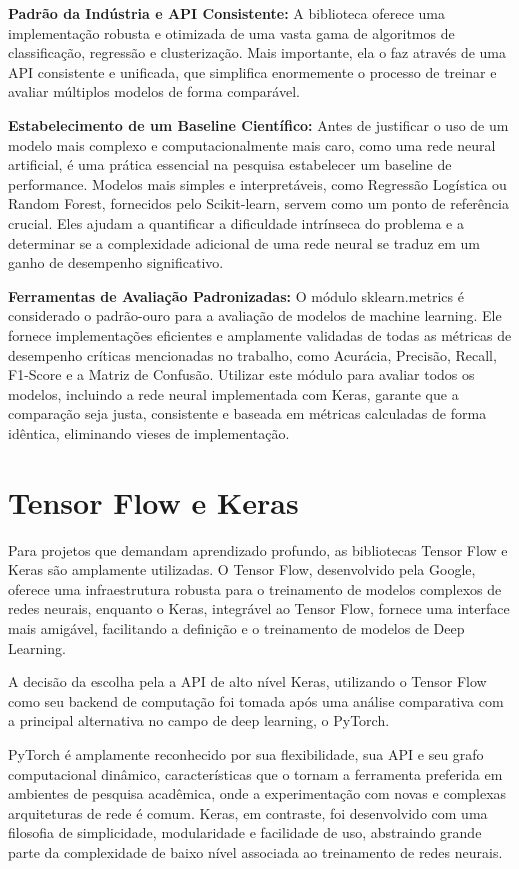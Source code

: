 \textbf{Padrão da Indústria e API Consistente:} A biblioteca oferece uma implementação robusta e otimizada de uma vasta gama de algoritmos de classificação, regressão e clusterização. Mais importante, ela o faz através de uma API consistente e unificada, que simplifica enormemente o processo de treinar e avaliar múltiplos modelos de forma comparável.

\textbf{Estabelecimento de um Baseline Científico:} Antes de justificar o uso de um modelo mais complexo e computacionalmente mais caro, como uma rede neural artificial, é uma prática essencial na pesquisa estabelecer um baseline de performance. Modelos mais simples e interpretáveis, como Regressão Logística ou Random Forest, fornecidos pelo Scikit-learn, servem como um ponto de referência crucial. Eles ajudam a quantificar a dificuldade intrínseca do problema e a determinar se a complexidade adicional de uma rede neural se traduz em um ganho de desempenho significativo.

\textbf{Ferramentas de Avaliação Padronizadas:} O módulo sklearn.metrics é considerado o padrão-ouro para a avaliação de modelos de machine learning. Ele fornece implementações eficientes e amplamente validadas de todas as métricas de desempenho críticas mencionadas no trabalho, como Acurácia, Precisão, Recall, F1-Score e a Matriz de Confusão. Utilizar este módulo para avaliar todos os modelos, incluindo a rede neural implementada com Keras, garante que a comparação seja justa, consistente e baseada em métricas calculadas de forma idêntica, eliminando vieses de implementação.

\section{Tensor Flow e Keras}
Para projetos que demandam aprendizado profundo, as bibliotecas Tensor Flow e Keras são amplamente utilizadas. O Tensor Flow, desenvolvido pela Google, oferece uma infraestrutura robusta para o treinamento de modelos complexos de redes neurais, enquanto o Keras, integrável ao Tensor Flow, fornece uma interface mais amigável, facilitando a definição e o treinamento de modelos de Deep Learning.

A decisão da escolha pela a API de alto nível Keras, utilizando o Tensor Flow como seu backend de computação foi tomada após uma análise comparativa com a principal alternativa no campo de deep learning, o PyTorch.

PyTorch é amplamente reconhecido por sua flexibilidade, sua API e seu grafo computacional dinâmico, características que o tornam a ferramenta preferida em ambientes de pesquisa acadêmica, onde a experimentação com novas e complexas arquiteturas de rede é comum. Keras, em contraste, foi desenvolvido com uma filosofia de simplicidade, modularidade e facilidade de uso, abstraindo grande parte da complexidade de baixo nível associada ao treinamento de redes neurais.

